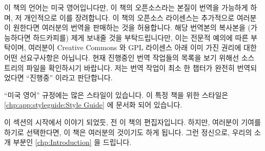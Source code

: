 이 책의 언어는 미국 영어입니다만, 이 책의 오픈소스라는 본질이 번역을 가능하게
하며, 저 개인적으로 이를 장려합니다.
이 책의 오픈소스 라이센스는 추가적으로 여러분이 원한다면 여러분의 번역을
판매하는 것을 허용합니다.
해당 번역본의 복사본을 (가능하다면 하드카피를) 제게 보내줄 것을 부탁드립니다만,
이는 전문적 예의에 따른 부탁이며, 여러분이 Creative Commons 와 GPL 라이센스
아래 이미 가진 권리에 대한 어떤 선요구사항은 아닙니다.
현재 진행중인 번역 작업들의 목록을 보기 위해선 소스 트리의  파일을
확인하시기 바랍니다.
저는 번역 작업이 최소 한 챕터가 완전히 번역되었다면 ``진행중'' 이라고
판단합니다.

\iffalse

This is quite similar to the Developer's Certificate of Origin (DCO)
1.1 used by the Linux kernel.
You must use your real name:  I unfortunately cannot accept pseudonymous or
anonymous contributions.

The language of this book is American English, however, the open-source
nature of this book permits translations, and I personally encourage them.
The open-source licenses covering this book additionally allow you
to sell your translation, if you wish.
I do request that you send me a copy of the translation (hardcopy if
available), but this is a request made as a professional courtesy,
and is not in any way a prerequisite to the permission that you already
have under the Creative Commons and GPL licenses.
Please see the \co{FAQ.txt} file in the source tree for a list of
translations currently in progress.
I consider a translation effort to be ``in progress'' once at least one
chapter has been fully translated.

\fi

``미국 영어'' 규정에는 많은 스타일이 있습니다.
이 특정 책을 위한 스타일은
\cref{chp:app:styleguide:Style Guide} 에 문서화 되어 있습니다.

이 섹션의 시작에서 이야기 되었듯, 전 이 책의 편집자입니다.
하지만, 여러분이 기여를 하기로 선택한다면, 이 책은 여러분의 것이기도 하게
됩니다.
그런 정신으로, 우리의 소개 부분인 \cref{chp:Introduction} 을 드립니다.

\iffalse

There are many styles under the ``American English'' rubric.
The style for this particular book is documented in
\cref{chp:app:styleguide:Style Guide}.

As noted at the beginning of this section, I am this book's editor.
However, if you choose to contribute, it will be your book as well.
In that spirit, I offer you \cref{chp:Introduction}, our introduction.

\fi


